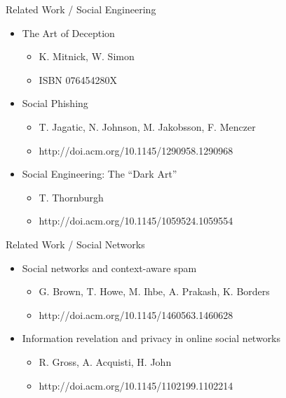 \documentclass[11pt]{beamer}
\begin{document}
\begin{frame}{Related Work / Social Engineering}
  \begin{itemize}
    \item The Art of Deception
    \begin{itemize}
      \item K. Mitnick, W. Simon
      \item ISBN 076454280X
    \end{itemize}
    \item Social Phishing
    \begin{itemize}
      \item T. Jagatic, N. Johnson, M. Jakobsson, F. Menczer
      \item http://doi.acm.org/10.1145/1290958.1290968
    \end{itemize}
    \item Social Engineering: The “Dark Art”
    \begin{itemize}
      \item T. Thornburgh
      \item http://doi.acm.org/10.1145/1059524.1059554
    \end{itemize}
  \end{itemize}
\end{frame}

\begin{frame}{Related Work / Social Networks}
  \begin{itemize}
    \item Social networks and context-aware spam
    \begin{itemize}
      \item  G. Brown, T. Howe, M. Ihbe, A. Prakash, K. Borders
      \item http://doi.acm.org/10.1145/1460563.1460628
    \end{itemize}
    \item Information revelation and privacy in online social networks
    \begin{itemize}
      \item R. Gross, A. Acquisti, H.  John
      \item http://doi.acm.org/10.1145/1102199.1102214
    \end{itemize}
  \end{itemize}
\end{frame}
\end{document}
